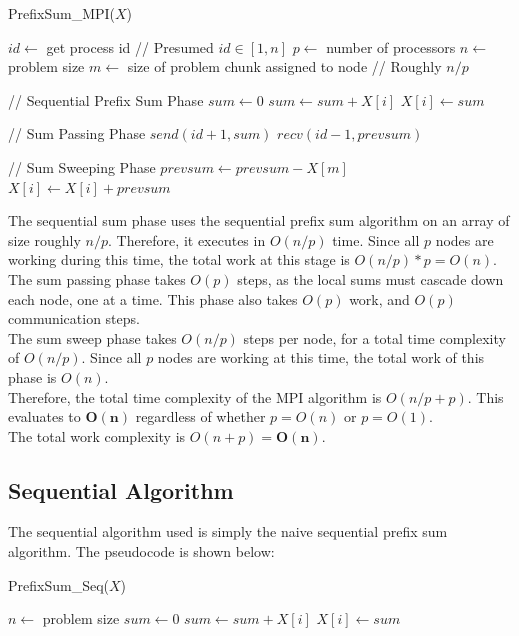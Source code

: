 \documentclass{article}
\begin{document}
\begin{algorithm}[H]
\caption{PrefixSum\_MPI($X$)}
\begin{algorithmic}[1]
\STATE $id \gets $ get process id // Presumed $id \in [1,n]$
\STATE $p \gets $ number of processors
\STATE $n \gets $ problem size
\STATE $m \gets $ size of problem chunk assigned to node // Roughly $n/p$
\item[]
\STATE // Sequential Prefix Sum Phase
\STATE $sum \gets 0$
	\STATE $sum \gets sum + X[i]$
	\STATE $X[i] \gets sum$
\ENDFOR
\item[]
\STATE // Sum Passing Phase
\STATE $send(id+1, sum)$
\STATE $recv(id-1, prevsum)$

\item[]
\STATE // Sum Sweeping Phase
\STATE $prevsum \gets prevsum - X[m]$
	\STATE $X[i] \gets X[i] + prevsum$
\ENDFOR

\end{algorithmic}
\end{algorithm}
The sequential sum phase uses the sequential prefix sum algorithm on an array of size roughly $n/p$.  Therefore, it executes in $O(n/p)$ time.  Since all $p$ nodes are working during this time, the total work at this stage is $O(n/p) * p = O(n)$.\\

The sum passing phase takes $O(p)$ steps, as the local sums must cascade down each node, one at a time.  This phase also takes $O(p)$ work, and $O(p)$ communication steps.\\

The sum sweep phase takes $O(n/p)$ steps per node, for a total time complexity of $O(n/p)$.  Since all $p$ nodes are working at this time, the total work of this phase is $O(n)$.\\

Therefore, the total time complexity of the MPI algorithm is $O(n/p + p)$. This evaluates to $\mathbf{O(n)}$ regardless of whether $p = O(n)$ or $p = O(1)$.\\
The total work complexity is $O(n + p) = \mathbf{O(n)}$. \\

\subsection*{Sequential Algorithm}
The sequential algorithm used is simply the naive sequential prefix sum algorithm.  The pseudocode is shown below:

\begin{algorithm}[H]
\caption{PrefixSum\_Seq($X$)}
\begin{algorithmic}[1]
\STATE $n \gets $ problem size
\STATE $sum \gets 0$
	\STATE $sum \gets sum + X[i]$
	\STATE $X[i] \gets sum$
\ENDFOR
\end{algorithmic}
\end{algorithm}
\end{document}
